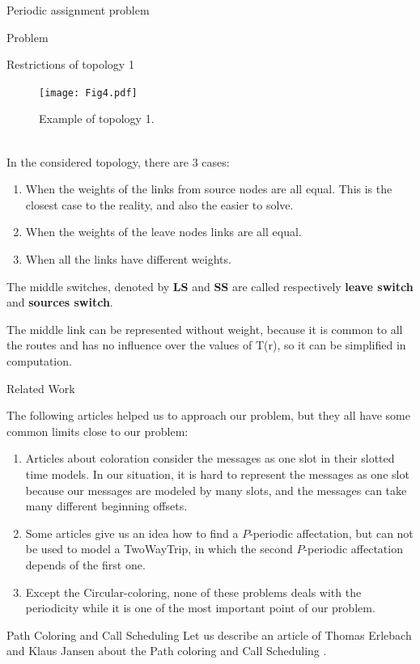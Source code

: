 \documentclass[a4paper,10pt]{report}
\begin{document}
\begin{chapter}{Periodic assignment problem}
\begin{section}{Problem}
\begin{subsection}{Restrictions of topology 1}
{{\begin{figure}[H]
\begin{center}
 \texttt{[image: Fig4.pdf]}\\
  \caption{Example of topology 1.}
 
\end{center}
\end{figure}
}}\\


In the considered topology, there are 3 cases:
\begin{enumerate}
 \item When the weights of the links from source nodes are all equal. This is the closest case to the reality, and also the easier to solve.
 \item When the weights of the leave nodes links are all equal.
 \item When all the links have different weights.
\end{enumerate}

The middle switches, denoted by {\bf LS} and {\bf SS} are called respectively {\bf leave switch} and {\bf sources switch}.

The middle link can be represented without weight, because it is common to all the routes and has no influence over the values of T(r), so it can be simplified in computation. 

\end{subsection}
\end{section}
\begin{section}{Related Work}

The following articles helped us to approach our problem, but they all have some common limits close to our problem:
\begin{enumerate}
 \item Articles about coloration consider the messages as one slot in their slotted time models. In our situation, it is hard to represent the messages as one slot because our messages are modeled by many slots, and the messages can take many different beginning offsets.
 \item Some articles give us an idea how to find a $P$-periodic affectation, but can not be used to model a TwoWayTrip, in which the second $P$-periodic affectation depends of the first one.
 \item Except the Circular-coloring, none of these problems deals with the periodicity while it is one of the most important point of our problem.
 
\end{enumerate}

\begin{subsection}{Path Coloring and Call Scheduling}
Let us describe an article of Thomas Erlebach and Klaus Jansen about the Path coloring and Call Scheduling \cite{erlebach2001complexity}.


\end{subsection}
\end{section}
\end{chapter}
\end{document}
